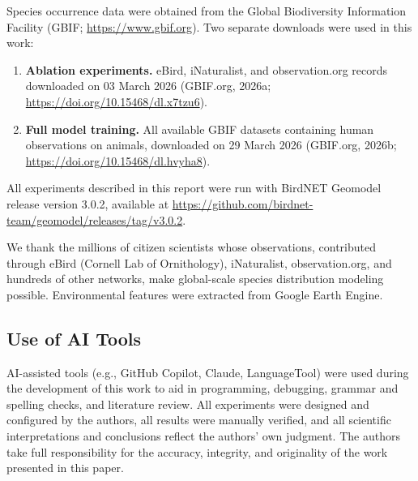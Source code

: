 Species occurrence data were obtained from the Global Biodiversity Information Facility (GBIF; \url{https://www.gbif.org}). Two separate downloads were used in this work:

\begin{enumerate}
  \item \textbf{Ablation experiments.} eBird, iNaturalist, and observation.org records downloaded
on 03 March 2026 (GBIF.org, 2026a; \url{https://doi.org/10.15468/dl.x7tzu6}).
  \item \textbf{Full model training.} All available GBIF datasets containing human observations on animals, downloaded on 29 March 2026
(GBIF.org, 2026b; \url{https://doi.org/10.15468/dl.hvyha8}).
\end{enumerate}

All experiments described in this report were run with BirdNET Geomodel release version 3.0.2, available at \url{https://github.com/birdnet-team/geomodel/releases/tag/v3.0.2}.

We thank the millions of citizen scientists whose observations, contributed through eBird (Cornell Lab of Ornithology), iNaturalist, observation.org, and hundreds of other networks, make global-scale species distribution modeling possible. Environmental features were extracted from Google Earth Engine.

\subsection{Use of AI Tools}
\label{sec:use-of-ai-tools}

AI-assisted tools (e.g., GitHub Copilot, Claude, LanguageTool) were used during the development of this work to aid in programming, debugging, grammar and spelling checks, and literature review. All experiments were designed and configured by the authors, all results were manually verified, and all scientific interpretations and conclusions reflect the authors' own judgment. The authors take full responsibility for the accuracy, integrity, and originality of the work presented in this paper.

